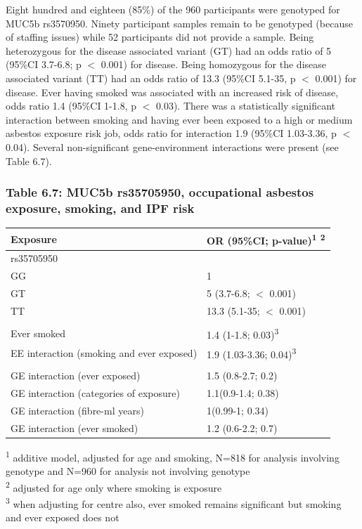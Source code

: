 Eight hundred and eighteen (85\%) of the 960 participants were genotyped
for MUC5b rs3570950. Ninety participant samples remain to be genotyped
(because of staffing issues) while 52 participants did not provide a
sample. Being heterozygous for the disease associated variant (GT) had
an odds ratio of 5 (95\%CI 3.7-6.8; p \ensuremath{<} 0.001) for disease.
Being homozygous for the disease associated variant (TT) had an odds
ratio of 13.3 (95\%CI 5.1-35, p \ensuremath{<} 0.001) for disease. Ever
having smoked was associated with an increased risk of disease, odds
ratio 1.4 (95\%CI 1-1.8, p \ensuremath{<} 0.03). There was a
statistically significant interaction between smoking and having ever
been exposed to a high or medium asbestos exposure risk job, odds ratio
for interaction 1.9 (95\%CI 1.03-3.36, p \ensuremath{<} 0.04). Several
non-significant gene-environment interactions were present (see Table
6.7).

\hypertarget{table-6.7-muc5b-rs35705950-occupational-asbestos-exposure-smoking-and-ipf-risk}{%
\subsubsection{Table 6.7: MUC5b rs35705950, occupational asbestos
exposure, smoking, and IPF
risk}\label{table-6.7-muc5b-rs35705950-occupational-asbestos-exposure-smoking-and-ipf-risk}}

\begin{longtable}[]{@{}ll@{}}
\toprule
Exposure & OR (95\%CI; p-value)\textsuperscript{1}
\textsuperscript{2}\tabularnewline
\midrule
\endhead
rs35705950 &\tabularnewline
GG & 1\tabularnewline
GT & 5 (3.7-6.8; \ensuremath{<} 0.001)\tabularnewline
TT & 13.3 (5.1-35; \ensuremath{<} 0.001)\tabularnewline
&\tabularnewline
Ever smoked & 1.4 (1-1.8; 0.03)\textsuperscript{3}\tabularnewline
EE interaction (smoking and ever exposed) & 1.9 (1.03-3.36;
0.04)\textsuperscript{3}\tabularnewline
&\tabularnewline
GE interaction (ever exposed) & 1.5 (0.8-2.7; 0.2)\tabularnewline
GE interaction (categories of exposure) & 1.1(0.9-1.4;
0.38)\tabularnewline
GE interaction (fibre-ml years) & 1(0.99-1; 0.34)\tabularnewline
GE interaction (ever smoked) & 1.2 (0.6-2.2; 0.7)\tabularnewline
\bottomrule
\end{longtable}

\textsuperscript{1} additive model, adjusted for age and smoking, N=818
for analysis involving genotype and N=960 for analysis not involving
genotype\\
\textsuperscript{2} adjusted for age only where smoking is exposure\\
\textsuperscript{3} when adjusting for centre also, ever smoked remains
significant but smoking and ever exposed does not

